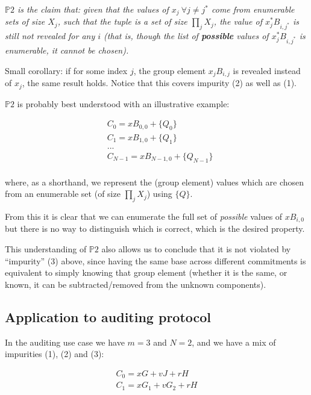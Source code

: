 \documentclass[10pt,a4paper]{article}
\begin{document}
\emph{$\mathbb{P}2$ is the claim that: given that the values of $x_j \ \forall j \neq j^*$ come from enumerable sets of size $X_j$, such that the tuple is a set of size $\prod_j X_j$, the value of $x_j^* B_{i,j^*}$ is still not revealed for any $i$ (that is, though the list of \textbf{possible} values of $x_j^* B_{i,j^*}$ is enumerable, it cannot be chosen).}

\vspace{5 pt}

Small corollary: if for some index $j$, the group element $x_jB_{i,j}$ is revealed instead of $x_j$, the same result holds. Notice that this covers impurity (2) as well as (1).

\vspace{5 pt}
$\mathbb{P}2$ is probably best understood with an illustrative example:

\begin{align*}
&C_0 = xB_{0,0} + \{Q_0\} \\
&C_1 = xB_{1,0} + \{Q_1\} \\
&...\\
&C_{N-1} = xB_{N-1,0} + \{Q_{N-1}\} \\
\end{align*}

where, as a shorthand, we represent the (group element) values which are chosen from an enumerable set (of size $\prod_j X_j$) using $\{Q\}$.

From this it is clear that we can enumerate the full set of \emph{possible} values of $xB_{i,0}$ but there is no way to distinguish which is correct, which is the desired property.

This understanding of $\mathbb{P}2$ also allows us to conclude that it is not violated by ``impurity'' (3) above, since having the same base across different commitments is equivalent to simply knowing that group element (whether it is the same, or known, it can be subtracted/removed from the unknown components).

\vspace{5 pt}

\subsection{Application to auditing protocol}

In the auditing use case we have $m=3$ and $N=2$, and we have a mix of impurities (1), (2) and (3):

\begin{align*}
C_0 = xG + vJ + rH \\
C_1 = xG_1 + vG_2 + rH
\end{align*}
\end{document}
